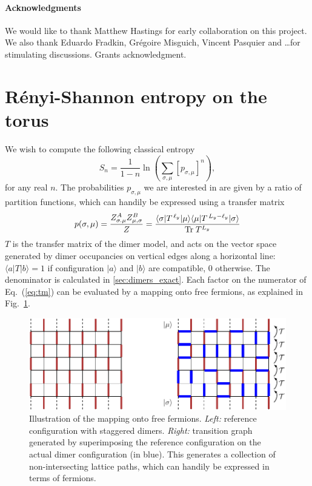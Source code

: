 \documentclass[11pt]{iopart}
\begin{document}
\paragraph{Acknowledgments}
 We would like to thank Matthew Hastings for early collaboration on this project. We also thank Eduardo Fradkin, Gr\'egoire Misguich, Vincent Pasquier and \ldots for stimulating discussions. Grants acknowledgment. 
 \appendix
 \clearpage

\section[\;\;\;\;\;\;\;\;\;\;\;\;\;\;R\'enyi-Shannon entropy on the torus]{R\'enyi-Shannon entropy on the torus}
\label{sec:lgv}
We wish to compute the following classical entropy
\begin{equation}
 S_n=\frac{1}{1-n} \ln \left(\sum_{\sigma,\mu} [p_{\sigma,\mu}]^n\right), 
\end{equation}
for any real $n$. The probabilities $p_{\sigma,\mu}$ we are interested in are given by a ratio of partition functions, which can handily be expressed using a transfer matrix
\begin{equation}\label{eq:tm}
 p(\sigma,\mu)=\frac{Z_{\sigma.\mu}^A Z_{\mu,\sigma}^B}{Z}=\frac{\langle  \sigma|T^{\,\ell_y}|\mu\rangle\langle \mu|T^{\,L_y-\ell_y}|\sigma\rangle}{{\rm Tr}\; T^{L_y}}
\end{equation}
$T$ is the transfer matrix of the dimer model, and acts on the vector space generated by dimer occupancies on vertical edges along a horizontal line: $\langle a|T|b\rangle=1$ if configuration $|a\rangle$ and $|b\rangle$ are compatible, $0$ otherwise. The denominator is calculated in \ref{sec:dimers_exact}. Each factor on the numerator of Eq.~(\ref{eq:tm}) can be evaluated by a mapping onto free fermions\cite{Lieb1967,Alet_dimers2,Shannonee}, as explained in Fig.~\ref{fig:freefermions}.  
\begin{figure}[ht]
\begin{center}
\includegraphics{./figures/free_fermions.pdf}
  \end{center}
  \caption{Illustration of the mapping onto free fermions. \emph{Left:} reference configuration with staggered dimers. \emph{Right:} transition graph generated by superimposing the reference configuration on the actual dimer configuration (in blue). This generates a collection of non-intersecting lattice paths, which can handily be expressed in terms of fermions. }
  \label{fig:freefermions}
  \end{figure}
\end{document}
